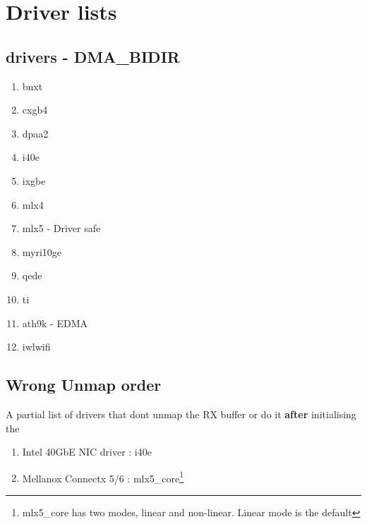 \newpage
\section{Driver lists}
\subsection{drivers - DMA\_BIDIR}
\begin{enumerate}
    \item bnxt
    \item cxgb4
    \item dpaa2
    \item i40e
    \item ixgbe
    \item mlx4
    \item mlx5 - Driver safe
    \item myri10ge
    \item qede
    \item ti
    \item ath9k - EDMA
    \item iwlwifi
\end{enumerate}
\subsection{Wrong Unmap order}{\label{apndx:wrong_order}}
A partial list of drivers that dont unmap the RX buffer or do it \textbf{after} initialising the \shinfo 
\begin{enumerate}
    \item Intel 40GbE NIC driver : i40e
    \item Mellanox Connectx 5/6 : mlx5\_core\footnote{mlx5\_core has two modes, linear and non-linear. Linear mode is the default}
\end{enumerate}
